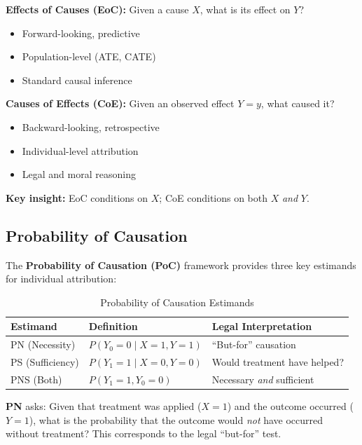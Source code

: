 \begin{tcolorbox}[colback=red!5!white, colframe=red!75!black,
    title=Effects of Causes vs. Causes of Effects]

\textbf{Effects of Causes (EoC):}
Given a cause $X$, what is its effect on $Y$?
\begin{itemize}[nosep]
\item Forward-looking, predictive
\item Population-level (ATE, CATE)
\item Standard causal inference
\end{itemize}

\textbf{Causes of Effects (CoE):}
Given an observed effect $Y=y$, what caused it?
\begin{itemize}[nosep]
\item Backward-looking, retrospective
\item Individual-level attribution
\item Legal and moral reasoning
\end{itemize}

\textbf{Key insight:} EoC conditions on $X$; CoE conditions on both $X$ \emph{and} $Y$.
\end{tcolorbox}

\subsection{Probability of Causation}

The \textbf{Probability of Causation (PoC)} framework \citep{tian2000probabilities}
provides three key estimands for individual attribution:

\begin{table}[h]
\centering
\caption{Probability of Causation Estimands}
\label{tab:poc}
\begin{tabular}{lll}
\toprule
\textbf{Estimand} & \textbf{Definition} & \textbf{Legal Interpretation} \\
\midrule
PN (Necessity) & $P(Y_0 = 0 \mid X = 1, Y = 1)$ & ``But-for'' causation \\
PS (Sufficiency) & $P(Y_1 = 1 \mid X = 0, Y = 0)$ & Would treatment have helped? \\
PNS (Both) & $P(Y_1 = 1, Y_0 = 0)$ & Necessary \emph{and} sufficient \\
\bottomrule
\end{tabular}
\end{table}

\textbf{PN} asks: Given that treatment was applied ($X=1$) and the outcome occurred ($Y=1$),
what is the probability that the outcome would \emph{not} have occurred without treatment?
This corresponds to the legal ``but-for'' test.

